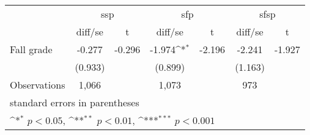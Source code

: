 {
\def\sym#1{\ifmmode^{#1}\else\(^{#1}\)\fi}
\begin{tabular}{l*{3}{cc}}
\hline\hline
                &\multicolumn{2}{c}{ssp}     &\multicolumn{2}{c}{sfp}     &\multicolumn{2}{c}{sfsp}    \\
                &  diff/se         &        t&  diff/se         &        t&  diff/se         &        t\\
\hline
Fall grade      &   -0.277         &   -0.296&   -1.974\sym{*}  &   -2.196&   -2.241         &   -1.927\\
                &  (0.933)         &         &  (0.899)         &         &  (1.163)         &         \\
\hline
Observations    &    1,066         &         &    1,073         &         &      973         &         \\
\hline\hline
\multicolumn{7}{l}{\footnotesize standard errors in parentheses}\\
\multicolumn{7}{l}{\footnotesize \sym{*} \(p<0.05\), \sym{**} \(p<0.01\), \sym{***} \(p<0.001\)}\\
\end{tabular}
}
